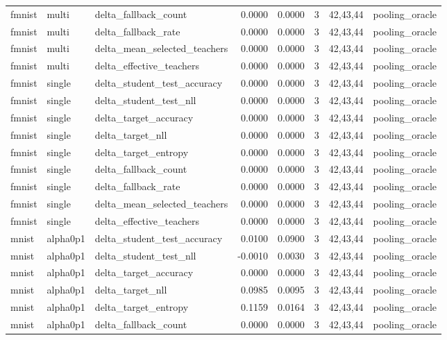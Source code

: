 \begin{tabular}{lllrrrll}
fmnist & multi & delta\_fallback\_count & 0.0000 & 0.0000 & 3 & 42,43,44 & pooling\_oracle \\
fmnist & multi & delta\_fallback\_rate & 0.0000 & 0.0000 & 3 & 42,43,44 & pooling\_oracle \\
fmnist & multi & delta\_mean\_selected\_teachers & 0.0000 & 0.0000 & 3 & 42,43,44 & pooling\_oracle \\
fmnist & multi & delta\_effective\_teachers & 0.0000 & 0.0000 & 3 & 42,43,44 & pooling\_oracle \\
fmnist & single & delta\_student\_test\_accuracy & 0.0000 & 0.0000 & 3 & 42,43,44 & pooling\_oracle \\
fmnist & single & delta\_student\_test\_nll & 0.0000 & 0.0000 & 3 & 42,43,44 & pooling\_oracle \\
fmnist & single & delta\_target\_accuracy & 0.0000 & 0.0000 & 3 & 42,43,44 & pooling\_oracle \\
fmnist & single & delta\_target\_nll & 0.0000 & 0.0000 & 3 & 42,43,44 & pooling\_oracle \\
fmnist & single & delta\_target\_entropy & 0.0000 & 0.0000 & 3 & 42,43,44 & pooling\_oracle \\
fmnist & single & delta\_fallback\_count & 0.0000 & 0.0000 & 3 & 42,43,44 & pooling\_oracle \\
fmnist & single & delta\_fallback\_rate & 0.0000 & 0.0000 & 3 & 42,43,44 & pooling\_oracle \\
fmnist & single & delta\_mean\_selected\_teachers & 0.0000 & 0.0000 & 3 & 42,43,44 & pooling\_oracle \\
fmnist & single & delta\_effective\_teachers & 0.0000 & 0.0000 & 3 & 42,43,44 & pooling\_oracle \\
mnist & alpha0p1 & delta\_student\_test\_accuracy & 0.0100 & 0.0900 & 3 & 42,43,44 & pooling\_oracle \\
mnist & alpha0p1 & delta\_student\_test\_nll & -0.0010 & 0.0030 & 3 & 42,43,44 & pooling\_oracle \\
mnist & alpha0p1 & delta\_target\_accuracy & 0.0000 & 0.0000 & 3 & 42,43,44 & pooling\_oracle \\
mnist & alpha0p1 & delta\_target\_nll & 0.0985 & 0.0095 & 3 & 42,43,44 & pooling\_oracle \\
mnist & alpha0p1 & delta\_target\_entropy & 0.1159 & 0.0164 & 3 & 42,43,44 & pooling\_oracle \\
mnist & alpha0p1 & delta\_fallback\_count & 0.0000 & 0.0000 & 3 & 42,43,44 & pooling\_oracle \\

\end{tabular}
